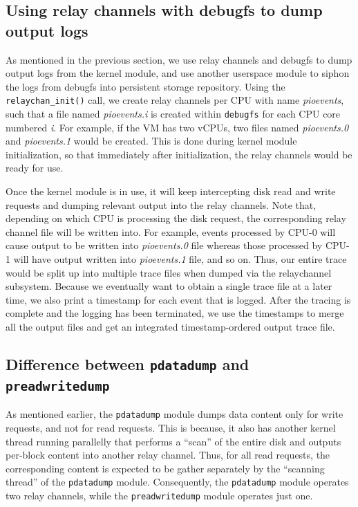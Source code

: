 \subsection{Using relay channels with debugfs to dump output logs}
As mentioned in the previous section, we use relay channels and
debugfs to dump output logs from the kernel module, and use another
userspace module to siphon the logs from debugfs into persistent
storage repository. Using the \texttt{relaychan\_init()} call, we
create relay channels per CPU with name \textit{pioevents}, such 
that a file named \textit{pioevents.i} is created within 
\texttt{debugfs} for each CPU core numbered \textit{i}. For 
example, if the VM has two vCPUs, two files named \textit{pioevents.0}
and \textit{pioevents.1} would be created. This is done during
kernel module initialization, so that immediately after initialization,
the relay channels would be ready for use.

Once the kernel module is in use, it will keep intercepting disk
read and write requests and dumping relevant output into the
relay channels. Note that, depending on which CPU is processing
the disk request, the corresponding relay channel file will be
written into. For example, events processed by CPU-0 will cause
output to be written into \textit{pioevents.0} file whereas those
processed by CPU-1 will have output written into 
\textit{pioevents.1} file,
and so on. Thus, our entire trace would be split up into multiple
trace files when dumped via the relaychannel subsystem. Because
we eventually want to obtain a single trace file at a later time, 
we also print a timestamp for each event that is logged. After the
tracing is complete and the logging has been terminated, we
use the timestamps to merge all the output files and get an
integrated timestamp-ordered output trace file.

\subsection{Difference between \texttt{pdatadump} and \texttt{preadwritedump}}
As mentioned earlier, the \texttt{pdatadump} module dumps data content
only for write requests, and not for read requests. This is because, 
it also has another kernel thread running parallelly that performs a 
``scan'' of the entire disk and outputs per-block content into another 
relay channel. Thus, for all read requests, the corresponding content
is expected to be gather separately by the ``scanning thread'' of the
\texttt{pdatadump} module. Consequently, the \texttt{pdatadump}
module operates two relay channels, while the \texttt{preadwritedump}
module operates just one.


